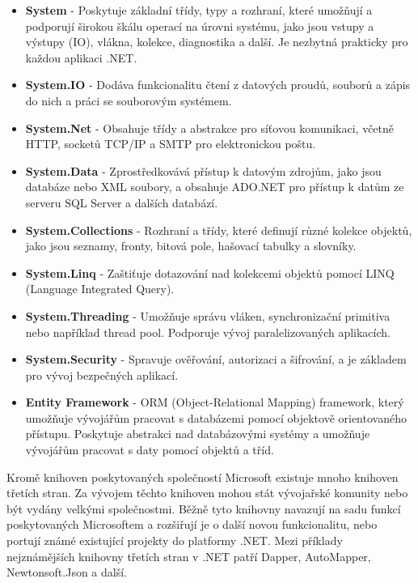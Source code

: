 \begin{itemize}
    \item \textbf{System} - Poskytuje základní třídy, typy a rozhraní, které umožňují a podporují širokou škálu operací na úrovni systému, jako jsou vstupy a výstupy (IO), vlákna, kolekce, diagnostika a další. Je nezbytná prakticky pro každou aplikaci .NET.
    \item \textbf{System.IO} - Dodáva funkcionalitu čtení z datových proudů, souborů a zápis do nich a práci se souborovým systémem.
    \item \textbf{System.Net} - Obsahuje třídy a abstrakce pro síťovou komunikaci, včetně HTTP, socketů TCP/IP a SMTP pro elektronickou poštu.
    \item \textbf{System.Data} - Zprostředkovává přístup k datovým zdrojům, jako jsou databáze nebo XML soubory, a obsahuje ADO.NET pro přístup k datům ze serveru SQL Server a dalších databází.
    \item \textbf{System.Collections} - Rozhraní a třídy, které definují různé kolekce objektů, jako jsou seznamy, fronty, bitová pole, hašovací tabulky a slovníky.
    \item \textbf{System.Linq} - Zaštiťuje dotazování nad kolekcemi objektů pomocí LINQ (Language Integrated Query).
    \item \textbf{System.Threading} - Umožňuje správu vláken, synchronizační primitiva nebo například thread pool. Podporuje vývoj paralelizovaných aplikacích.
    \item \textbf{System.Security} - Spravuje ověřování, autorizaci a šifrování, a je základem pro vývoj bezpečných aplikací.
    \item \textbf{Entity Framework} - ORM (Object-Relational Mapping) framework, který umožňuje vývojářům pracovat s databázemi pomocí objektově orientovaného přístupu. Poskytuje abstrakci nad databázovými systémy a umožňuje vývojářům pracovat s daty pomocí objektů a tříd.
\end{itemize}

Kromě knihoven poskytovaných společností Microsoft existuje mnoho knihoven třetích stran. Za vývojem těchto knihoven mohou stát vývojařské komunity nebo být vydány velkými společnostmi. Běžně tyto knihovny navazují na sadu funkcí poskytovaných Microsoftem a rozšiřují je o další novou funkcionalitu, nebo portují známé existující projekty do platformy .NET. Mezi příklady nejznámějších knihovny třetích stran v .NET patří Dapper, AutoMapper, Newtonsoft.Json a další.


